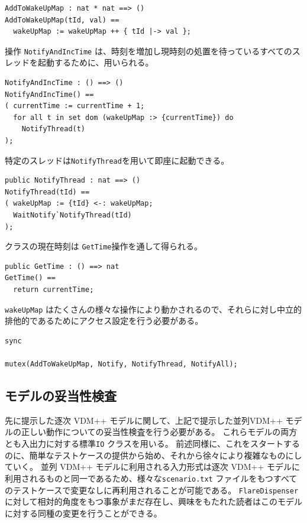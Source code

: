\documentclass[\pformat,12pt]{jreport}
\begin{document}
\begin{lstlisting}
AddToWakeUpMap : nat * nat ==> ()
AddToWakeUpMap(tId, val) ==
  wakeUpMap := wakeUpMap ++ { tId |-> val };
\end{lstlisting}

操作 \texttt{NotifyAndIncTime} は、時刻を増加し現時刻の処置を待っているすべてのスレッドを起動するために、用いられる。

\begin{lstlisting}
NotifyAndIncTime : () ==> ()
NotifyAndIncTime() ==
( currentTime := currentTime + 1;
  for all t in set dom (wakeUpMap :> {currentTime}) do
    NotifyThread(t)
);
\end{lstlisting}

特定のスレッドは\texttt{NotifyThread}を用いて即座に起動できる。

\begin{lstlisting}
public NotifyThread : nat ==> ()
NotifyThread(tId) ==
( wakeUpMap := {tId} <-: wakeUpMap;
  WaitNotify`NotifyThread(tId)
);
\end{lstlisting}

クラスの現在時刻は \texttt{GetTime}操作を通して得られる。

\begin{lstlisting}
public GetTime : () ==> nat
GetTime() ==
  return currentTime;
\end{lstlisting}

 \texttt{wakeUpMap} はたくさんの様々な操作により動かされるので、それらに対し中立的排他的であるためにアクセス設定を行う必要がある。

\begin{lstlisting}
sync

mutex(AddToWakeUpMap, Notify, NotifyThread, NotifyAll);
\end{lstlisting}





\subsection{モデルの妥当性検査}

先に提示した逐次 VDM++ モデルに関して、上記で提示した並列VDM++ モデルの正しい動作についての妥当性検査を行う必要がある。
これらモデルの両方とも入出力に対する標準\texttt{IO} クラスを用いる。
前述同様に、これをスタートするのに、簡単なテストケースの提供から始め、それから徐々により複雑なものにしていく。
並列 VDM++ モデルに利用される入力形式は逐次 VDM++ モデルに利用されるものと同一であるため、様々な\texttt{scenario.txt} ファイルをもつすべてのテストケースで変更なしに再利用されることが可能である。
 \texttt{FlareDispenser}に対して相対的角度をもつ事象がまだ存在し、興味をもたれた読者はこのモデルに対する同種の変更を行うことができる。
\end{document}
